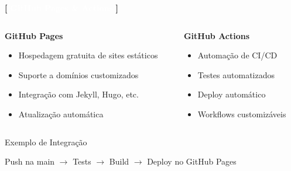 \documentclass[10pt, brazil]{beamer}
\begin{document}
\begin{frame}{\textcolor{lightpurple}{\textbf{[}} \textbf{\textcolor{white}{GitHub Pages \& Actions}} \textcolor{lightpurple}{\textbf{]}}}
  
  \begin{columns}
    \begin{column}{0.5\textwidth}
      \textbf{GitHub Pages}
      \begin{itemize}
        \item Hospedagem gratuita de sites estáticos
        \item Suporte a domínios customizados
        \item Integração com Jekyll, Hugo, etc.
        \item Atualização automática
      \end{itemize}
    \end{column}
    \begin{column}{0.5\textwidth}
      \textbf{GitHub Actions}
      \begin{itemize}
        \item Automação de CI/CD
        \item Testes automatizados
        \item Deploy automático
        \item Workflows customizáveis
      \end{itemize}
    \end{column}
  \end{columns}

  \vspace{1em}

  \begin{block}{Exemplo de Integração}
    \begin{scriptsize}
      Push na main $\rightarrow$ Tests $\rightarrow$ Build $\rightarrow$ Deploy no GitHub Pages
    \end{scriptsize}
  \end{block}

\end{frame}
\end{document}
